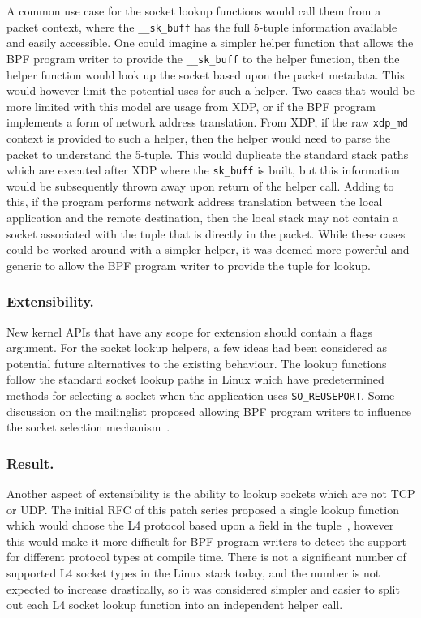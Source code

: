 \documentclass[10pt,sigconf,authorversion]{lpc}
\begin{document}
A common use case for the socket lookup functions would call them from a packet
context, where the \verb+__sk_buff+ has the full 5-tuple information available
and easily accessible. One could imagine a simpler helper function that allows
the BPF program writer to provide the \verb+__sk_buff+ to the helper function,
then the helper function would look up the socket based upon the packet
metadata. This would however limit the potential uses for such a helper. Two
cases that would be more limited with this model are usage from XDP, or if the
BPF program implements a form of network address translation. From XDP, if the
raw \verb+xdp_md+ context is provided to such a helper, then the helper would
need to parse the packet to understand the 5-tuple. This would duplicate the
standard stack paths which are executed after XDP where the \verb+sk_buff+ is
built, but this information would be subsequently thrown away upon return of
the helper call. Adding to this, if the program performs network address
translation between the local application and the remote destination, then the
local stack may not contain a socket associated with the tuple that is directly
in the packet. While these cases could be worked around with a simpler helper,
it was deemed more powerful and generic to allow the BPF program writer to
provide the tuple for lookup.

\subsubsection{Extensibility.}

New kernel APIs that have any scope for extension should contain a flags
argument. For the socket lookup helpers, a few ideas had been considered as
potential future alternatives to the existing behaviour. The lookup functions
follow the standard socket lookup paths in Linux which have predetermined
methods for selecting a socket when the application uses \verb+SO_REUSEPORT+.
Some discussion on the mailinglist proposed allowing BPF program writers to
influence the socket selection mechanism~\cite{netdev-sk-select}.

\subsubsection{Result.}

Another aspect of extensibility is the ability to lookup sockets which are not
TCP or UDP. The initial RFC of this patch series proposed a single lookup
function which would choose the L4 protocol based upon a field in the
tuple~\cite{sk-lookup-rfc}, however this would make it more difficult for BPF
program writers to detect the support for different protocol types at compile
time. There is not a significant number of supported L4 socket types in the
Linux stack today, and the number is not expected to increase drastically, so
it was considered simpler and easier to split out each L4 socket lookup
function into an independent helper call.
\end{document}
